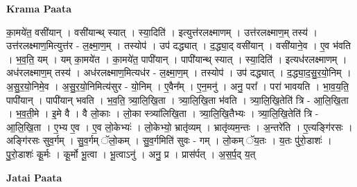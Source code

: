 \documentclass[17pt]{extarticle}
\begin{document}
\textbf{Krama Paata} \newline

का॒मये॑त॒ वसी॑यान् । वसी॑यान्थ् स्यात् । स्या॒दिति॑ । इत्युत्त॑रलक्ष्माणम् । उत्त॑रलक्ष्माण॒म् तस्य॑ । उत्त॑रलक्ष्माण॒मित्युत्त॑र - ल॒क्ष्मा॒ण॒म् । तस्योप॑ । उप॑ दद्ध्यात् । द॒द्ध्या॒द् वसी॑यान् । वसी॑याने॒व । ए॒व भ॑वति । भ॒व॒ति॒ यम् । यम् का॒मये॑त । का॒मये॑त॒ पापी॑यान् । पापी॑यान्थ् स्यात् । स्या॒दिति॑ । इत्यध॑रलक्ष्माणम् । अध॑रलक्ष्माण॒म् तस्य॑ । अध॑रलक्ष्माण॒मित्यध॑र - ल॒क्ष्मा॒ण॒म् । तस्योप॑ । उप॑ दद्ध्यात् । द॒द्ध्या॒द॒सु॒र॒यो॒निम् । अ॒सु॒र॒यो॒निमे॒व । अ॒सु॒र॒यो॒निमित्य॑सुर - यो॒निम् । ए॒वैन᳚म् । ए॒न॒मनु॑ । अनु॒ परा᳚ । परा॑ भावयति । भा॒व॒य॒ति॒ पापी॑यान् । पापी॑यान् भवति । भ॒व॒ति॒ त्र्या॒लि॒खि॒ता । त्र्या॒लि॒खि॒ता भ॑वति । त्र्या॒लि॒खि॒तेति॑ त्रि - आ॒लि॒खि॒ता । भ॒व॒ती॒मे । इ॒मे वै । वै लो॒काः । लो॒का स्त्र्या॑लिखि॒ता । त्र्या॒लि॒खि॒तैभ्यः । त्र्या॒लि॒खि॒तेति॑ त्रि - आ॒लि॒खि॒ता । ए॒भ्य ए॒व । ए॒व लो॒केभ्यः॑ । लो॒केभ्यो॒ भ्रातृ॑व्यम् । भ्रातृ॑व्यम॒न्तः । अ॒न्तरे॑ति । ए॒त्यङ्गि॑रसः । अङ्गि॑रसः सुव॒र्गम् । सु॒व॒र्गम् ॅलो॒कम् । सु॒व॒र्गमिति॑ सुवः - गम् । लो॒कम् ॅय॒तः । य॒तः पु॑रो॒डाशः॑ । पु॒रो॒डाशः॑ कू॒र्मः । कू॒र्मो भू॒त्वा । भू॒त्वाऽनु॑ । अनु॒ प्र । प्रास॑र्पत् । अ॒स॒र्प॒द् य॒त् \newline

\textbf{Jatai Paata} \newline
\end{document}
